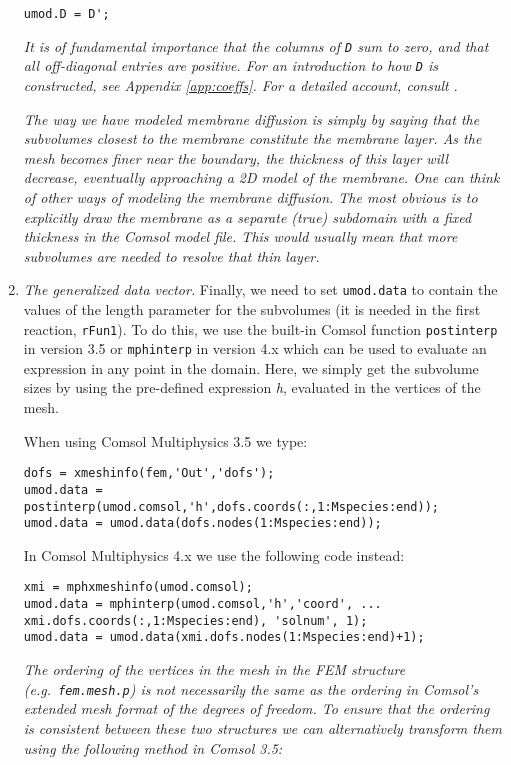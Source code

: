 \begin{enumerate}
\begin{verbatim}
umod.D = D';
\end{verbatim}

 {\color{red}{\bf !}} \emph{It is of fundamental importance that the
   columns of \texttt{D} sum to zero, and that all off-diagonal
   entries are positive. For an introduction to how \texttt{D} is
   constructed, see Appendix \ref{app:coeffs}. For a detailed account,
   consult \cite{SPDEPEFHL}}.
 
 {\color{red}{\bf !}} \emph{The way we have modeled membrane diffusion
   is simply by saying that the subvolumes closest to the membrane
   constitute the membrane layer. As the mesh becomes finer near the
   boundary, the thickness of this layer will decrease, eventually
   approaching a 2D model of the membrane. One can think of other ways
   of modeling the membrane diffusion. The most obvious is to
   explicitly draw the membrane as a separate (true) subdomain with a
   fixed thickness in the Comsol model file. This would usually mean
   that more subvolumes are needed to resolve that thin layer.}
 
 \item \emph{The generalized data vector.} Finally, we need to set
   \texttt{umod.data} to contain the values of the length
   parameter for the subvolumes (it is needed in the first reaction,
   \texttt{rFun1}). To do this, we use the built-in Comsol function
   \texttt{postinterp} in version 3.5 or \texttt{mphinterp} in version 4.x 
   which can be used to evaluate an expression in
   any point in the domain. Here, we simply get the subvolume sizes by
   using the pre-defined expression \emph{h}, evaluated in the
   vertices of the mesh.

When using Comsol Multiphysics 3.5 we type:
\begin{verbatim}
dofs = xmeshinfo(fem,'Out','dofs');
umod.data = postinterp(umod.comsol,'h',dofs.coords(:,1:Mspecies:end));
umod.data = umod.data(dofs.nodes(1:Mspecies:end));
\end{verbatim}

In Comsol Multiphysics 4.x we use the following code instead:
\begin{verbatim}
xmi = mphxmeshinfo(umod.comsol);
umod.data = mphinterp(umod.comsol,'h','coord', ...
xmi.dofs.coords(:,1:Mspecies:end), 'solnum', 1);
umod.data = umod.data(xmi.dofs.nodes(1:Mspecies:end)+1);
\end{verbatim}

{\color{red}{\bf !}} \emph{The ordering of the vertices in the mesh 
 in the FEM structure (e.g.\ \texttt{fem.mesh.p}) is not necessarily the same as the ordering in 
 Comsol's extended mesh format of the degrees of freedom.  To ensure that the ordering is consistent 
 between these two structures we can alternatively transform them using the following method in Comsol 3.5:}


\end{enumerate}
